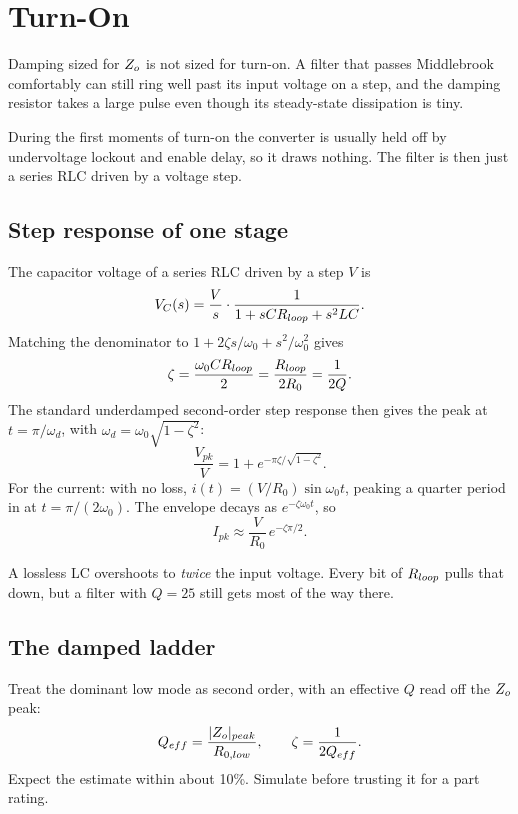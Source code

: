\chapter{Turn-On}
\label{ch:turn-on}

Damping sized for $Z_o$ is not sized for turn-on. A filter that passes
Middlebrook comfortably can still ring well past its input voltage on a
step, and the damping resistor takes a large pulse even though its
steady-state dissipation is tiny.

During the first moments of turn-on the converter is usually held off by
undervoltage lockout and enable delay, so it draws nothing. The filter is then
just a series RLC driven by a voltage step.

\section{Step response of one stage}

\begin{derivation}
	The capacitor voltage of a series RLC driven by a step $V$ is
	\[
		V_C(s) = \frac{V}{s}\cdot\frac{1}{1 + sCR_{loop} + s^2LC}.
	\]
	Matching the denominator to $1 + 2\zeta s/\omega_0 + s^2/\omega_0^2$ gives
	\[
		\zeta = \frac{\omega_0 CR_{loop}}{2} = \frac{R_{loop}}{2R_0} = \frac{1}{2Q}.
	\]
	The standard underdamped second-order step response then gives the
	peak at $t = \pi/\omega_d$, with $\omega_d = \omega_0\sqrt{1 - \zeta^2}$:
	\[
		\frac{V_{pk}}{V} = 1 + e^{-\pi\zeta/\sqrt{1-\zeta^2}}.
	\]
	For the current: with no loss, $i(t) = (V/R_0)\sin\omega_0 t$, peaking a
	quarter period in at $t = \pi/(2\omega_0)$. The envelope decays as
	$e^{-\zeta\omega_0 t}$, so
	\[
		I_{pk} \approx \frac{V}{R_0}\,e^{-\zeta\pi/2}.
	\]
\end{derivation}

\begin{idea}
	A lossless LC overshoots to \emph{twice} the input voltage. Every bit of
	$R_{loop}$ pulls that down, but a filter with $Q = 25$ still gets most of the way there.
\end{idea}

\section{The damped ladder}

Treat the dominant low mode as second order, with an effective $Q$ read off
the $Z_o$ peak:
\[
	Q_{eff} = \frac{\lvert Z_o\rvert_{peak}}{R_{0,low}}, \qquad \zeta = \frac{1}{2Q_{eff}}.
\]
Expect the estimate within about 10\%. Simulate before trusting it for a part rating.

